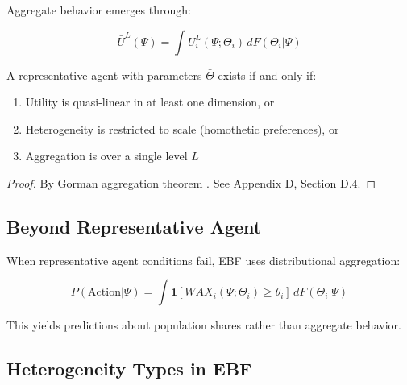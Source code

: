 Aggregate behavior emerges through:

\begin{equation}
\bar{U}^L(\Psi) = \int U^L_i(\Psi; \Theta_i) \, dF(\Theta_i | \Psi)
\end{equation}

\begin{proposition}
A representative agent with parameters $\bar{\Theta}$ exists if and only if:
\begin{enumerate}
\item Utility is quasi-linear in at least one dimension, or
\item Heterogeneity is restricted to scale (homothetic preferences), or
\item Aggregation is over a single level $L$
\end{enumerate}
\end{proposition}

\begin{proof}
By Gorman aggregation theorem \citep{gorman1953community}.
See Appendix D, Section D.4.
\end{proof}

\subsection{Beyond Representative Agent}

When representative agent conditions fail, EBF uses distributional aggregation:

\begin{equation}
P(\text{Action} | \Psi) = \int \mathbf{1}[WAX_i(\Psi; \Theta_i) \geq \theta_i] \, dF(\Theta_i | \Psi)
\end{equation}

This yields predictions about population shares rather than aggregate behavior.

\subsection{Heterogeneity Types in EBF}

